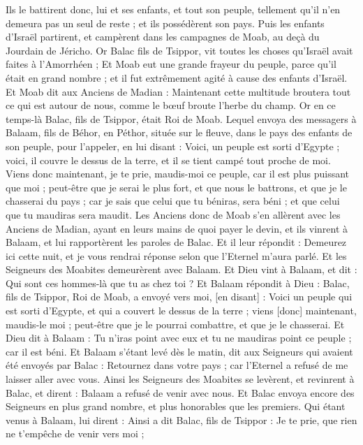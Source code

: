 \begin{multicols}{2}
Ils le battirent donc, lui et ses enfants, et tout son peuple, tellement qu'il n'en demeura pas un seul de reste ; et ils possédèrent son pays.
\VerseOne{}Puis les enfants d'Israël partirent, et campèrent dans les campagnes de Moab, au deçà du Jourdain de Jéricho.
Or Balac fils de Tsippor, vit toutes les choses qu'Israël avait faites à l'Amorrhéen ;
Et Moab eut une grande frayeur du peuple, parce qu'il était en grand nombre ; et il fut extrêmement agité à cause des enfants d'Israël.
Et Moab dit aux Anciens de Madian : Maintenant cette multitude broutera tout ce qui est autour de nous, comme le bœuf broute l'herbe du champ. Or en ce temps-là Balac, fils de Tsippor, était Roi de Moab.
Lequel envoya des messagers à Balaam, fils de Béhor, en Péthor, située sur le fleuve, dans le pays des enfants de son peuple, pour l'appeler, en lui disant : Voici, un peuple est sorti d'Egypte ; voici, il couvre le dessus de la terre, et il se tient campé tout proche de moi.
Viens donc maintenant, je te prie, maudis-moi ce peuple, car il est plus puissant que moi ; peut-être que je serai le plus fort, et que nous le battrons, et que je le chasserai du pays ; car je sais que celui que tu béniras, sera béni ; et que celui que tu maudiras sera maudit.
Les Anciens donc de Moab s'en allèrent avec les Anciens de Madian, ayant en leurs mains de quoi payer le devin, et ils vinrent à Balaam, et lui rapportèrent les paroles de Balac.
Et il leur répondit : Demeurez ici cette nuit, et je vous rendrai réponse selon que l'Eternel m'aura parlé. Et les Seigneurs des Moabites demeurèrent avec Balaam.
Et Dieu vint à Balaam, et dit : Qui sont ces hommes-là que tu as chez toi ?
Et Balaam répondit à Dieu : Balac, fils de Tsippor, Roi de Moab, a envoyé vers moi, [en disant] :
Voici un peuple qui est sorti d'Egypte, et qui a couvert le dessus de la terre ; viens [donc] maintenant, maudis-le moi ; peut-être que je le pourrai combattre, et que je le chasserai.
Et Dieu dit à Balaam : Tu n'iras point avec eux et tu ne maudiras point ce peuple ; car il est béni.
Et Balaam s'étant levé dès le matin, dit aux Seigneurs qui avaient été envoyés par Balac : Retournez dans votre pays ; car l'Eternel a refusé de me laisser aller avec vous.
Ainsi les Seigneurs des Moabites se levèrent, et revinrent à Balac, et dirent : Balaam a refusé de venir avec nous.
Et Balac envoya encore des Seigneurs en plus grand nombre, et plus honorables que les premiers.
Qui étant venus à Balaam, lui dirent : Ainsi a dit Balac, fils de Tsippor : Je te prie, que rien ne t'empêche de venir vers moi ;

\end{multicols}

